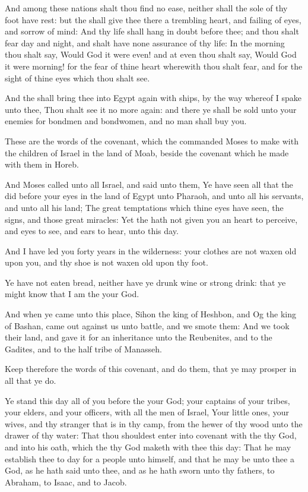 \Verse And among these nations shalt thou find no ease, neither shall the sole of thy foot have rest: but the \LORD shall give thee there a trembling heart, and failing of eyes, and sorrow of mind: \Verse And thy life shall hang in doubt before thee; and thou shalt fear day and night, and shalt have none assurance of thy life: \Verse In the morning thou shalt say, Would God it were even! and at even thou shalt say, Would God it were morning! for the fear of thine heart wherewith thou shalt fear, and for the sight of thine eyes which thou shalt see.

\Verse And the \LORD shall bring thee into Egypt again with ships, by the way whereof I spake unto thee, Thou shalt see it no more again: and there ye shall be sold unto your enemies for bondmen and bondwomen, and no man shall buy you.


\Chapter
\Verse These are the words of the covenant, which the \LORD commanded Moses to make with the children of Israel in the land of Moab, beside the covenant which he made with them in Horeb.

\Verse And Moses called unto all Israel, and said unto them, Ye have seen all that the \LORD did before your eyes in the land of Egypt unto Pharaoh, and unto all his servants, and unto all his land; \Verse The great temptations which thine eyes have seen, the signs, and those great miracles: \Verse Yet the \LORD hath not given you an heart to perceive, and eyes to see, and ears to hear, unto this day.

\Verse And I have led you forty years in the wilderness: your clothes are not waxen old upon you, and thy shoe is not waxen old upon thy foot.

\Verse Ye have not eaten bread, neither have ye drunk wine or strong drink: that ye might know that I am the \LORD your God.

\Verse And when ye came unto this place, Sihon the king of Heshbon, and Og the king of Bashan, came out against us unto battle, and we smote them: \Verse And we took their land, and gave it for an inheritance unto the Reubenites, and to the Gadites, and to the half tribe of Manasseh.

\Verse Keep therefore the words of this covenant, and do them, that ye may prosper in all that ye do.

\Verse Ye stand this day all of you before the \LORD your God; your captains of your tribes, your elders, and your officers, with all the men of Israel, \Verse Your little ones, your wives, and thy stranger that is in thy camp, from the hewer of thy wood unto the drawer of thy water: \Verse That thou shouldest enter into covenant with the \LORD thy God, and into his oath, which the \LORD thy God maketh with thee this day: \Verse That he may establish thee to day for a people unto himself, and that he may be unto thee a God, as he hath said unto thee, and as he hath sworn unto thy fathers, to Abraham, to Isaac, and to Jacob.

